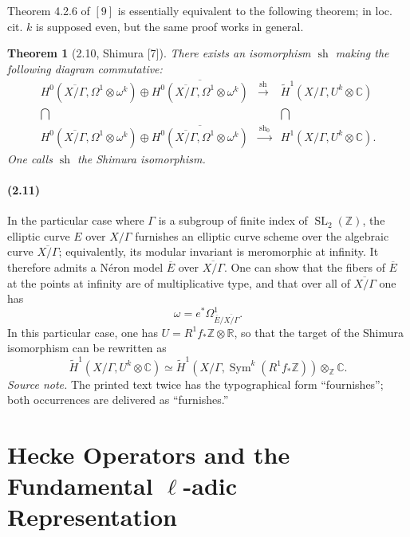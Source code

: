 \documentclass[10pt]{article}
\newcommand{\C}{\mathbb C}
\newcommand{\R}{\mathbb R}
\newcommand{\Z}{\mathbb Z}
\newcommand{\SL}{\operatorname{SL}}
\newcommand{\Sym}{\operatorname{Sym}}
\newcommand{\sh}{\operatorname{sh}}
\newtheorem*{theorem}{Theorem}
\begin{document}
Theorem 4.2.6 of \([9]\) is essentially equivalent to the following theorem; in loc. cit.
$k$ is supposed even, but the same proof works in general.

\begin{theorem}[2.10, Shimura {\rm [7]}]
There exists an isomorphism $\sh$ making the following diagram commutative:
\[
\begin{array}{ccc}
H^0(\overline{X/\Gamma},\Omega^1\otimes\omega^k)\oplus
\overline{H^0(\overline{X/\Gamma},\Omega^1\otimes\omega^k)}
& \xrightarrow{\ \sh\ } &
\widetilde H^1(X/\Gamma,U^k\otimes\C)
\\[0.4em]
\bigcap && \bigcap
\\[0.4em]
H^0(\overline{X/\Gamma},\Omega^1\otimes\omega^k)\oplus
\overline{H^0(\overline{X/\Gamma},\Omega^1\otimes\omega^k)}
& \xrightarrow{\ \sh_0\ } &
H^1(X/\Gamma,U^k\otimes\C).
\end{array}
\]
One calls $\sh$ the Shimura isomorphism.
\end{theorem}

\paragraph{(2.11)}
In the particular case where $\Gamma$ is a subgroup of finite index of $\SL_2(\Z)$, the
elliptic curve $E$ over $X/\Gamma$ furnishes an elliptic curve scheme over the algebraic
curve $\overline{X/\Gamma}$; equivalently, its modular invariant is meromorphic at infinity.
It therefore admits a Néron model $\overline{E}$ over $\overline{X/\Gamma}$. One can show that the
fibers of $\overline{E}$ at the points at infinity are of multiplicative type, and that over all of
$\overline{X/\Gamma}$ one has
\[
\omega=e^*\Omega^1_{\overline{E}/\overline{X/\Gamma}}.
\]
In this particular case, one has $U=R^1f_*\Z\otimes\R$, so that the target of the Shimura
isomorphism can be rewritten as
\[
\widetilde H^1(X/\Gamma,U^k\otimes\C)
\simeq
\widetilde H^1(X/\Gamma,\Sym^k(R^1f_*\Z))\otimes_\Z\C .
\]
\noindent\emph{Source note.} The printed text twice has the typographical form ``fournishes''; both occurrences are delivered as ``furnishes.''

\section{Hecke Operators and the Fundamental $\ell$-adic Representation}
\end{document}
